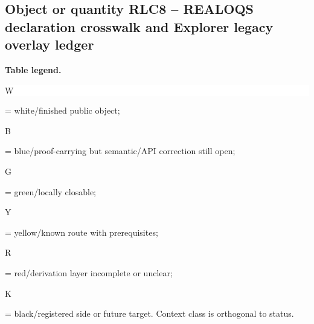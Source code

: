 \subsection*{Object or quantity RLC8 -- REALOQS declaration crosswalk and Explorer legacy overlay ledger}
\hypertarget{objproof:RLC8}{}
\par\smallskip\noindent\begin{minipage}{0.99\linewidth}\footnotesize\raggedright\textbf{Table legend.} \colorbox{white}{\strut W} = white/finished public object; \colorbox{cyan!20}{\strut B} = blue/proof-carrying but semantic/API correction still open; \colorbox{green!18}{\strut G} = green/locally closable; \colorbox{yellow!25}{\strut Y} = yellow/known route with prerequisites; \colorbox{red!20}{\strut R} = red/derivation layer incomplete or unclear; \colorbox{black!18}{\strut K} = black/registered side or future target. Context class is orthogonal to status.\end{minipage}\par\vspace{0.25em}
